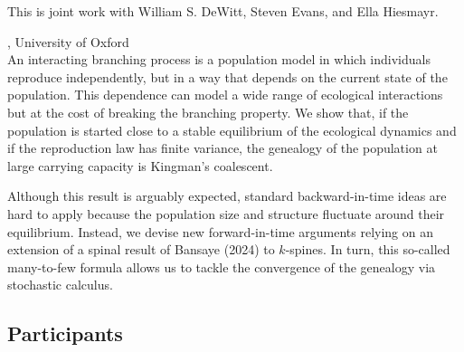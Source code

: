 \documentclass[12pt,a4paper]{article}
\begin{document}
 This is joint work with William S. DeWitt, Steven Evans, and Ella Hiesmayr. 

\bigskip\bigskip

, University of Oxford \\[2ex] An interacting branching process is a population model in which individuals reproduce independently, but in a way that depends on the current state of the population. This dependence can model a wide range of ecological interactions but at the cost of breaking the branching property. We show that, if the population is started close to a stable equilibrium of the ecological dynamics and if the reproduction law has finite variance, the genealogy of the population at large carrying capacity is Kingman's coalescent. 

 Although this result is arguably expected, standard backward-in-time ideas are hard to apply because the population size and structure fluctuate around their equilibrium. Instead, we devise new forward-in-time arguments relying on an extension of a spinal result of Bansaye (2024) to $k$-spines. In turn, this so-called many-to-few formula allows us to tackle the convergence of the genealogy via stochastic calculus. 

\bigskip\bigskip

\newpage
\vfill
\vfill

\newpage
 
\subsection*{Participants}
\end{document}
